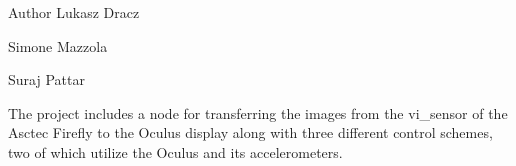 \begin{DoxyAuthor}{Author}
Lukasz Dracz 

Simone Mazzola 

Suraj Pattar
\end{DoxyAuthor}
The project includes a node for transferring the images from the vi\+\_\+sensor of the Asctec Firefly to the Oculus display along with three different control schemes, two of which utilize the Oculus and its accelerometers. 